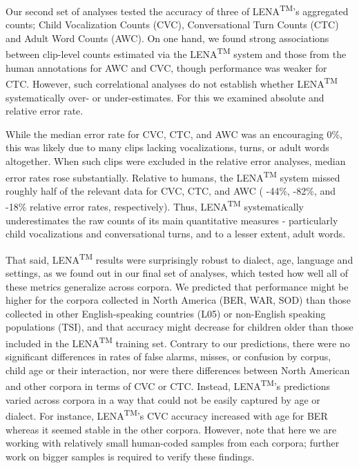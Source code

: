 \documentclass[english,floatsintext,man]{apa6}
\begin{document}
Our second set of analyses tested the accuracy of three of
LENA\textsuperscript{TM}'s aggregated counts; Child Vocalization Counts
(CVC), Conversational Turn Counts (CTC) and Adult Word Counts (AWC). On
one hand, we found strong associations between clip-level counts
estimated via the LENA\textsuperscript{TM} system and those from the
human annotations for AWC and CVC, though performance was weaker for
CTC. However, such correlational analyses do not establish whether
LENA\textsuperscript{TM} systematically over- or under-estimates. For
this we examined absolute and relative error rate.

While the median error rate for CVC, CTC, and AWC was an encouraging
0\%, this was likely due to many clips lacking vocalizations, turns, or
adult words altogether. When such clips were excluded in the relative
error analyses, median error rates rose substantially. Relative to
humans, the LENA\textsuperscript{TM} system missed roughly half of the
relevant data for CVC, CTC, and AWC ( -44\%, -82\%, and -18\% relative
error rates, respectively). Thus, LENA\textsuperscript{TM}
systematically underestimates the raw counts of its main quantitative
measures - particularly child vocalizations and conversational turns,
and to a lesser extent, adult words.

That said, LENA\textsuperscript{TM} results were surprisingly robust to
dialect, age, language and settings, as we found out in our final set of
analyses, which tested how well all of these metrics generalize across
corpora. We predicted that performance might be higher for the corpora
collected in North America (BER, WAR, SOD) than those collected in other
English-speaking countries (L05) or non-English speaking populations
(TSI), and that accuracy might decrease for children older than those
included in the LENA\textsuperscript{TM} training set. Contrary to our
predictions, there were no significant differences in rates of false
alarms, misses, or confusion by corpus, child age or their interaction,
nor were there differences between North American and other corpora in
terms of CVC or CTC. Instead, LENA\textsuperscript{TM}'s predictions
varied across corpora in a way that could not be easily captured by age
or dialect. For instance, LENA\textsuperscript{TM}'s CVC accuracy
increased with age for BER whereas it seemed stable in the other
corpora. However, note that here we are working with relatively small
human-coded samples from each corpora; further work on bigger samples is
required to verify these findings.
\end{document}
